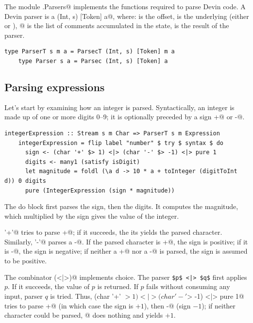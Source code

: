 \documentclass[UdineBachThesis,american,11pt]{PhdThesis}
\begin{document}
  The module \lstinline@Devin.Parsers@ implements the functions required to
  parse Devin code. A Devin parser is a \lstinline@Parsec (Int, s) [Token] a@,
  where: \lstinline@Int@ is the offset, \lstinline@s@ is the underlying
  \lstinline@Steam@ (either \lstinline@String@ or \lstinline@Text@),
  \lstinline@[Token]@ is the list of comments accumulated in the state,
  \lstinline@a@ is the result of the parser.

  \begin{lstlisting}[gobble=4,basicstyle=\ttfamily\small]
    type ParserT s m a = ParsecT (Int, s) [Token] m a
    type Parser s a = Parsec (Int, s) [Token] a
  \end{lstlisting}

  \subsection{Parsing expressions}

  Let's start by examining how an integer is parsed. Syntactically, an integer
  is made up of one or more digits 0--9; it is optionally preceded by a sign
  \lstinline@+@ or \lstinline@-@.

  \begin{lstlisting}[gobble=4,basicstyle=\ttfamily\small]
    integerExpression :: Stream s m Char => ParserT s m Expression
    integerExpression = flip label "number" $ try $ syntax $ do
      sign <- (char '+' $> 1) <|> (char '-' $> -1) <|> pure 1
      digits <- many1 (satisfy isDigit)
      let magnitude = foldl (\a d -> 10 * a + toInteger (digitToInt d)) 0 digits
      pure (IntegerExpression (sign * magnitude))
  \end{lstlisting}

  The do block first parses the sign, then the digits. It computes the
  magnitude, which multiplied by the sign gives the value of the integer.

  \lstinline@char '+'@ tries to parse \lstinline@+@; if it succeeds, the its
  yields the parsed character. Similarly, \lstinline@char '-'@ parses a
  \lstinline@-@. If the parsed character is \lstinline@+@, the sign is positive;
  if it is \lstinline@-@, the sign is negative; if neither a \lstinline@+@ nor a
  \lstinline@-@ is parsed, the sign is assumed to be positive.

  The combinator \lstinline@(<|>)@ implements choice. The parser
  \lstinline[mathescape]@$p$ <|> $q$@ first applies $p$. If it succeeds, the
  value of $p$ is returned. If $p$ fails without consuming any input, parser $q$
  is tried. Thus, \lstinline@(char '+' $> 1) <|> (char '-' $> -1) <|> pure 1@
  tries to parse \lstinline@+@ (in which case the sign is $+1$), then
  \lstinline@-@ (sign $-1$); if neither character could be parsed,
  @ does nothing and yields $+1$.
\end{document}
